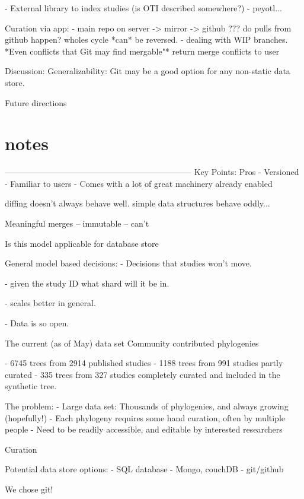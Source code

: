 \documentclass[a4paper,10pt]{article}
\begin{document}
      - External library to index studies (is OTI described somewhere?)
      - peyotl...
      
      Curation via app:
        - main repo on server -> mirror -> github
            ??? do pulls from github happen? wholes cycle *can* be reversed.
        - dealing with WIP branches.
        *Even conflicts that Git may find mergable"*
        return merge conflicts to user

 Discussion:
   Generalizability:
      Git may be a good option for any non-static data store.
      
  Future directions

  
  



\section{notes}
  --------------------------------------------------------------------
Key Points:
Pros
 - Versioned
 - Familiar to users
 - Comes with a lot of great machinery already enabled

diffing doesn't always behave well.
simple data structures behave oddly...

Meaningful merges
 -- immutable
 -- can't

Is this model applicable for database store

General model based decisions:
- Decisions that studies won't move.

- given the study ID what shard will it be in.

- scales better in general.

- Data is so open.



 The current (as of May) data set
 Community contributed phylogenies

 - 6745 trees from 2914 published studies
 - 1188 trees from 991 studies partly curated 
 - 335 trees from 327 studies completely curated and included in the synthetic tree.

 The problem:
 - Large data set: Thousands of phylogenies, and always growing (hopefully!)
 - Each phylogeny requires some hand curation, often by multiple people
 - Need to be readily accessible, and editable by interested researchers

Curation

 Potential data store options:
 - SQL database
 - Mongo, couchDB
 - git/github


 We chose git!
\end{document}
